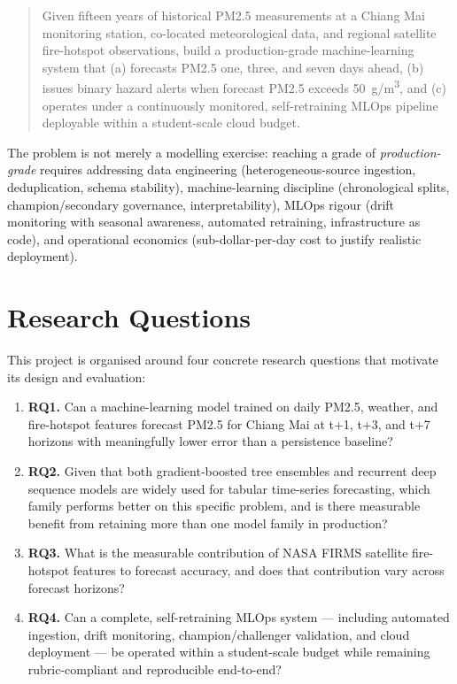 \begin{quote}
Given fifteen years of historical PM2.5 measurements at a Chiang Mai
monitoring station, co-located meteorological data, and regional satellite
fire-hotspot observations, build a production-grade machine-learning system
that (a) forecasts PM2.5 one, three, and seven days ahead, (b) issues binary
hazard alerts when forecast PM2.5 exceeds 50~\textmu g/m\textsuperscript{3},
and (c) operates under a continuously monitored, self-retraining MLOps
pipeline deployable within a student-scale cloud budget.
\end{quote}

The problem is not merely a modelling exercise: reaching a grade of
\emph{production-grade} requires addressing data engineering
(heterogeneous-source ingestion, deduplication, schema stability),
machine-learning discipline (chronological splits, champion/secondary
governance, interpretability), MLOps rigour (drift monitoring with
seasonal awareness, automated retraining, infrastructure as code), and
operational economics (sub-dollar-per-day cost to justify realistic
deployment).

\section{Research Questions}

This project is organised around four concrete research questions that
motivate its design and evaluation:

\begin{enumerate}
    \item \textbf{RQ1.} Can a machine-learning model trained on daily
          PM2.5, weather, and fire-hotspot features forecast PM2.5 for
          Chiang Mai at t+1, t+3, and t+7 horizons with meaningfully lower
          error than a persistence baseline?

    \item \textbf{RQ2.} Given that both gradient-boosted tree ensembles
          and recurrent deep sequence models are widely used for tabular
          time-series forecasting, which family performs better on this
          specific problem, and is there measurable benefit from retaining
          more than one model family in production?

    \item \textbf{RQ3.} What is the measurable contribution of NASA FIRMS
          satellite fire-hotspot features to forecast accuracy, and does
          that contribution vary across forecast horizons?

    \item \textbf{RQ4.} Can a complete, self-retraining MLOps system ---
          including automated ingestion, drift monitoring, champion/challenger
          validation, and cloud deployment --- be operated within a
          student-scale budget while remaining rubric-compliant and
          reproducible end-to-end?
\end{enumerate}

